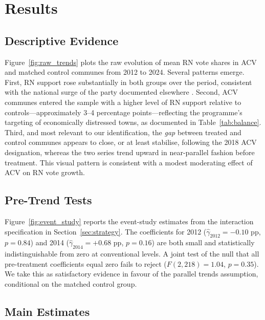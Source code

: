 
\section{Results}
\label{sec:results}

\subsection{Descriptive Evidence}

Figure~\ref{fig:raw_trends} plots the raw evolution of mean RN vote shares in ACV and matched control communes from 2012 to 2024. Several patterns emerge. First, RN support rose substantially in both groups over the period, consistent with the national surge of the party documented elsewhere \citep{Reny2021}. Second, ACV communes entered the sample with a higher level of RN support relative to controls---approximately 3--4 percentage points---reflecting the programme's targeting of economically distressed towns, as documented in Table~\ref{tab:balance}. Third, and most relevant to our identification, the \textit{gap} between treated and control communes appears to close, or at least stabilise, following the 2018 ACV designation, whereas the two series trend upward in near-parallel fashion before treatment. This visual pattern is consistent with a modest moderating effect of ACV on RN vote growth.

\subsection{Pre-Trend Tests}

Figure~\ref{fig:event_study} reports the event-study estimates from the interaction specification in Section~\ref{sec:strategy}. The coefficients for 2012 ($\hat{\gamma}_{2012} = -0.10$ pp, $p = 0.84$) and 2014 ($\hat{\gamma}_{2014} = +0.68$ pp, $p = 0.16$) are both small and statistically indistinguishable from zero at conventional levels. A joint test of the null that all pre-treatment coefficients equal zero fails to reject ($F(2,218) = 1.04$, $p = 0.35$). We take this as satisfactory evidence in favour of the parallel trends assumption, conditional on the matched control group.

\subsection{Main Estimates}

